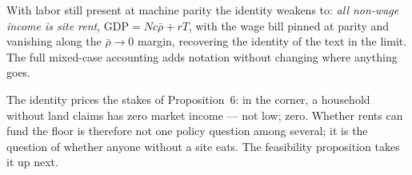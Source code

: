 \begin{remark}
With labor still present at machine parity the identity weakens to:
\emph{all non-wage income is site rent},
$\mathrm{GDP} = N c\bar\rho + rT$, with the wage bill pinned at parity and
vanishing along the $\bar\rho \to 0$ margin, recovering the identity of the
text in the limit. The full mixed-case accounting adds notation without
changing where anything goes.
\end{remark}

\begin{remark}
The identity prices the stakes of Proposition~6: in the corner, a household
without land claims has zero market income --- not low; zero. Whether rents
can fund the floor is therefore not one policy question among several; it is
the question of whether anyone without a site eats. The feasibility
proposition takes it up next.
\end{remark}

%
